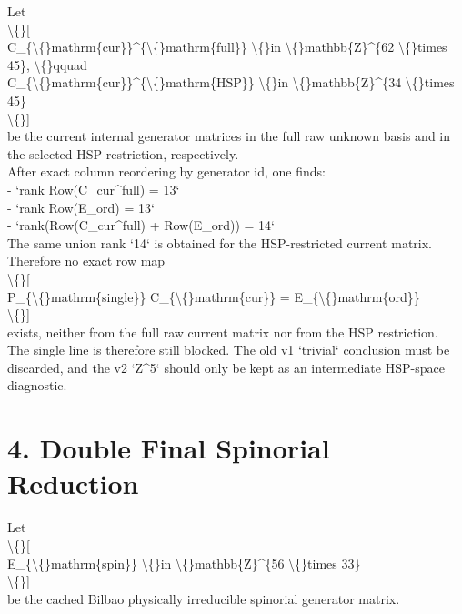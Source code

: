 \documentclass[11pt]{article}
\begin{document}
Let\\
\textbackslash\{\}[\\
C\_\{\textbackslash\{\}mathrm\{cur\}\}\textasciicircum{}\{\textbackslash\{\}mathrm\{full\}\} \textbackslash\{\}in \textbackslash\{\}mathbb\{Z\}\textasciicircum{}\{62 \textbackslash\{\}times 45\}, \textbackslash\{\}qquad\\
C\_\{\textbackslash\{\}mathrm\{cur\}\}\textasciicircum{}\{\textbackslash\{\}mathrm\{HSP\}\} \textbackslash\{\}in \textbackslash\{\}mathbb\{Z\}\textasciicircum{}\{34 \textbackslash\{\}times 45\}\\
\textbackslash\{\}]\\
be the current internal generator matrices in the full raw unknown basis and in the selected HSP restriction, respectively.\\

After exact column reordering by generator id, one finds:\\

- `rank Row(C\_cur\textasciicircum{}full) = 13`\\
- `rank Row(E\_ord) = 13`\\
- `rank(Row(C\_cur\textasciicircum{}full) + Row(E\_ord)) = 14`\\

The same union rank `14` is obtained for the HSP-restricted current matrix. Therefore no exact row map\\
\textbackslash\{\}[\\
P\_\{\textbackslash\{\}mathrm\{single\}\} C\_\{\textbackslash\{\}mathrm\{cur\}\} = E\_\{\textbackslash\{\}mathrm\{ord\}\}\\
\textbackslash\{\}]\\
exists, neither from the full raw current matrix nor from the HSP restriction.\\

The single line is therefore still blocked. The old v1 `trivial` conclusion must be discarded, and the v2 `Z\textasciicircum{}5` should only be kept as an intermediate HSP-space diagnostic.\\

\section*{4. Double Final Spinorial Reduction}

Let\\
\textbackslash\{\}[\\
E\_\{\textbackslash\{\}mathrm\{spin\}\} \textbackslash\{\}in \textbackslash\{\}mathbb\{Z\}\textasciicircum{}\{56 \textbackslash\{\}times 33\}\\
\textbackslash\{\}]\\
be the cached Bilbao physically irreducible spinorial generator matrix.\\
\end{document}
